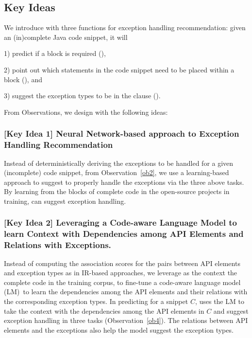 \subsection{Key Ideas}
\label{key:sec}

We introduce {\tool} with three functions for exception handling
recommendation: given an (in)complete Java code snippet, it will

1) predict if a  block is required ({\xblock}),

2) point out which statements in the code snippet need to be placed within
a  block ({\xstate}), and

3) suggest the exception types to be in the 
clause ({\xtype}).

From Observations, we design {\tool} with the following
ideas:

\subsubsection{[Key Idea 1] Neural Network-based approach to Exception Handling Recommendation}
Instead of deterministically deriving the exceptions to be handled for
a given (incomplete) code snippet, from Observation~\ref{ob2}, we
use a learning-based approach to suggest to properly handle the
exceptions via the three above tasks.
By learning from the  blocks of complete code in
the open-source projects in training, {\tool} can
suggest exception handling.




\subsubsection{[Key Idea 2] Leveraging a Code-aware Language Model to learn Context with Dependencies among API Elements and Relations with Exceptions.}
  
Instead of computing the association scores for the pairs between API
elements and exception types as in IR-based approaches, we leverage as
the context the complete code in the training corpus, to fine-tune a code-aware
language model (LM)~to learn the dependencies among the API elements and their
relations with the corresponding exception types.
%
In predicting for a snippet $C$, {\tool} uses the LM to take the
context with the dependencies among the API elements in $C$ and suggest
exception handling in three tasks (Observation~\ref{ob4}). The
relations between API elements and the exceptions also help the model
suggest the exception types.

